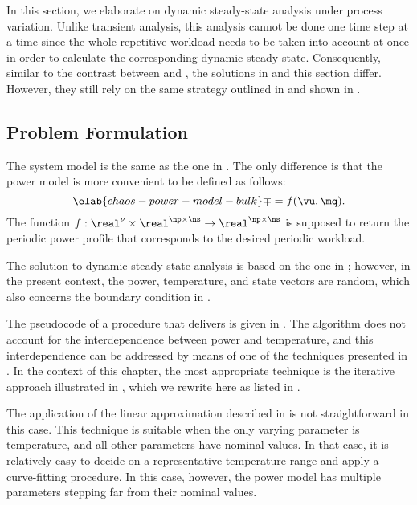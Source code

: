 In this section, we elaborate on dynamic steady-state analysis under process
variation. Unlike transient analysis, this analysis cannot be done one time step
at a time since the whole repetitive workload needs to be taken into account at
once in order to calculate the corresponding dynamic steady state. Consequently,
similar to the contrast between  and
, the solutions in
 and this section differ. However, they still
rely on the same strategy outlined in  and
shown in .

\subsection{Problem Formulation}

The system model is the same as the one in . The
only difference is that the power model is more convenient to be defined as
follows:
\begin{equation} \elab{chaos-power-model-bulk}
  \mp = f(\vu, \mq).
\end{equation}
The function $f: \real^\nu \times \real^{\np \times \ns} \to \real^{\np \times
\ns}$ is supposed to return the periodic power profile that corresponds to the
desired periodic workload.

The solution to dynamic steady-state analysis is based on the one in
; however, in the present context, the
power, temperature, and state vectors are random, which also concerns the
boundary condition in .

The pseudocode of a procedure that delivers \mq is given in
. The algorithm does not account for the
interdependence between power and temperature, and this interdependence can be
addressed by means of one of the techniques presented in
. In the context of this chapter, the most
appropriate technique is the iterative approach illustrated in
, which we rewrite here as listed in
.

\begin{remark}
The application of the linear approximation described in
 is not straightforward in this case. This
technique is suitable when the only varying parameter is temperature, and all
other parameters have nominal values. In that case, it is relatively easy to
decide on a representative temperature range and apply a curve-fitting
procedure. In this case, however, the power model has multiple parameters
stepping far from their nominal values.
\end{remark}

